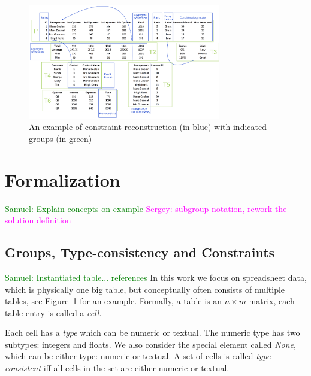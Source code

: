 \documentclass{ecai}
\newcommand{\sergey}[1]{\textcolor{magenta}{{\sc Sergey:} #1}\xspace}
\newcommand{\samuel}[1]{\textcolor{green}{{\sc Samuel:} #1}\xspace}
\begin{document}
\begin{figure}[tbh]
  \begin{center}
    \includegraphics[width=0.75\textwidth]{figures/Demo.png}
  \end{center}
  \vspace{-10pt}
  \caption{An example of constraint reconstruction (in blue) with indicated groups (in green)}
  \label{fig:main_example}
\end{figure}

\section{Formalization}
\samuel{Explain concepts on example}
\sergey{subgroup notation, rework the solution definition}
\subsection{Groups, Type-consistency and Constraints}
\samuel{Instantiated table... references}
In this work we focus on spreadsheet data, which is physically one big table, but conceptually often consists of multiple tables, see Figure~\ref{fig:main_example} for an example.
Formally, a table is an $n \times m$ matrix, each table entry is called  a \textit{cell}.

Each cell has a {\em type} which can be numeric or textual.
The numeric type has two subtypes: integers and floats.
We also consider the special element called \textit{None}, which can be either type: numeric or textual.
A set of cells is called \textit{type-consistent} iff all cells in the set are either numeric or textual.
\end{document}
